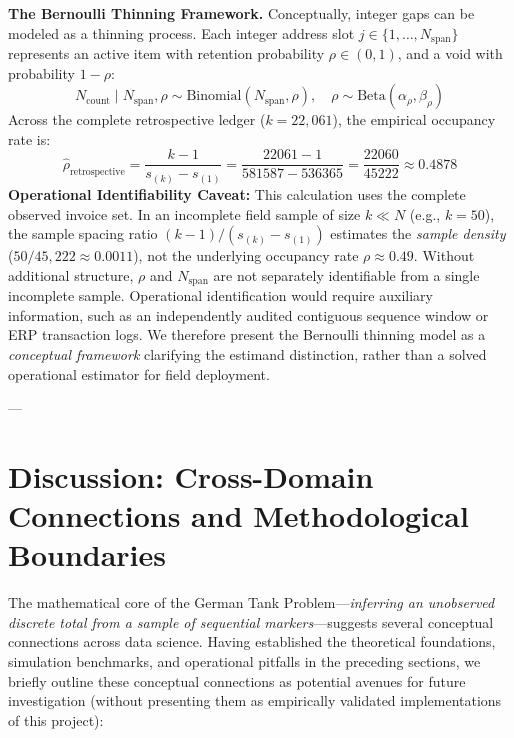 \documentclass[10pt,a4paper]{article}
\begin{document}
\textbf{The Bernoulli Thinning Framework.} Conceptually, integer gaps can be modeled as a thinning process. Each integer address slot $j \in \{1, \dots, N_{\text{span}}\}$ represents an active item with retention probability $\rho \in (0, 1)$, and a void with probability $1 - \rho$:
\begin{equation}
N_{\text{count}} \mid N_{\text{span}}, \rho \sim \text{Binomial}(N_{\text{span}}, \rho), \quad \rho \sim \text{Beta}(\alpha_\rho, \beta_\rho)
\label{eq:thinning}
\end{equation}
Across the complete retrospective ledger ($k = 22,061$), the empirical occupancy rate is:
\begin{equation}
\hat{\rho}_{\text{retrospective}} = \frac{k - 1}{s_{(k)} - s_{(1)}} = \frac{22061 - 1}{581587 - 536365} = \frac{22060}{45222} \approx 0.4878
\end{equation}
\textbf{Operational Identifiability Caveat:} This calculation uses the complete observed invoice set. In an incomplete field sample of size $k \ll N$ (e.g., $k = 50$), the sample spacing ratio $(k - 1) / (s_{(k)} - s_{(1)})$ estimates the \emph{sample density} ($50 / 45,222 \approx 0.0011$), not the underlying occupancy rate $\rho \approx 0.49$. Without additional structure, $\rho$ and $N_{\text{span}}$ are not separately identifiable from a single incomplete sample. Operational identification would require auxiliary information, such as an independently audited contiguous sequence window or ERP transaction logs. We therefore present the Bernoulli thinning model as a \emph{conceptual framework} clarifying the estimand distinction, rather than a solved operational estimator for field deployment.

---

\section{Discussion: Cross-Domain Connections and Methodological Boundaries}

The mathematical core of the German Tank Problem---\textit{inferring an unobserved discrete total from a sample of sequential markers}---suggests several conceptual connections across data science. Having established the theoretical foundations, simulation benchmarks, and operational pitfalls in the preceding sections, we briefly outline these conceptual connections as potential avenues for future investigation (without presenting them as empirically validated implementations of this project):
\end{document}
